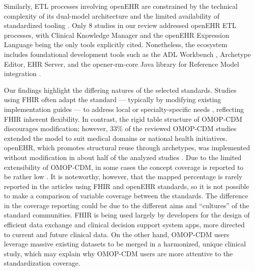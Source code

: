 Similarly, ETL processes involving openEHR are constrained by the technical complexity of its dual-model architecture and the limited availability of standardized tooling \cite{wulff_transformation_2021}. Only 8 studies in our review addressed openEHR ETL processes, with Clinical Knowledge Manager \cite{li_configurable_2022,kohler_eos_2023} and the openEHR Expression Language \cite{li_patient-screening_2021} being the only tools explicitly cited. Nonetheless, the ecosystem includes foundational development tools such as the ADL Workbench \cite{tian_application_2021}, Archetype Editor, EHR Server, and the opener-rm-core Java library for Reference Model integration \cite{chen_openehr_2007}.

Our findings highlight the differing natures of the selected standards. Studies using FHIR often adapt the standard --- typically by modifying existing implementation guides --- to address local or specialty-specific needs \cite{bennett2023mimic,dolin_sync_2023,song_implementation_2023,khalifa_interoperable_2021,seong_fast_2021,thayer_human-centered_2021,xiao_development_2021,zong_modeling_2021,chukwu_standardizing_2022,sinaci2023data,bialke_fhir_2022,gonzalez-castro_caside_2021,gulden_prototypical_2021,kawamoto_establishing_2021,wesley_novel_2021,phelan_beyond_2024,shehab_national_2024,stellmach_creation_2023,bae_development_2022,gruendner_architecture_2022,jung_shared_2022,rosenau_generation_2022,dolin_vcf2fhir_2021_p1}, reflecting FHIR inherent flexibility. In contrast, the rigid table structure of OMOP-CDM discourages modification; however, 33\% of the reviewed OMOP-CDM studies \cite{cai_advancing_2023,chechulina_semi-automated_2023,kempf_how_2023,kim_transforming_2021,paris_transformation_2021,raventos_transforming_2023,bhattacharjee_inspire_2024,choi_conversion_2022,papez_transforming_2023,almeida_two-stage_2021,biedermann_standardizing_2021,lamer_transforming_2021,papez_transforming_2021,ward_omop_2024,kim_scalable_2023,oja_transforming_2023} extended the model to suit medical domains or national health initiatives. openEHR, which promotes structural reuse through archetypes, was implemented without modification in about half of the analyzed studies \cite{li_configurable_2022,li_patient-screening_2021,kohler_eos_2023,sommer_structured_2022}. Due to the limited extensibility of OMOP-CDM, in some cases the concept coverage is reported to be rather low \cite{jung_patient-level_2022,yu_developing_2022}. It is noteworthy, however, that the mapped percentage is rarely reported in the articles using FHIR and openEHR standards, so it is not possible to make a comparison of variable coverage between the standards. The difference in the coverage reporting could be due to the different aims and ``cultures'' of the standard communities. FHIR is being used largely by developers for the design of efficient data exchange and clinical decision support system apps, more directed to current and future clinical data. On the other hand, OMOP-CDM users leverage massive existing datasets to be merged in a harmonized, unique clinical study, which may explain why OMOP-CDM users are more attentive to the standardization coverage.

